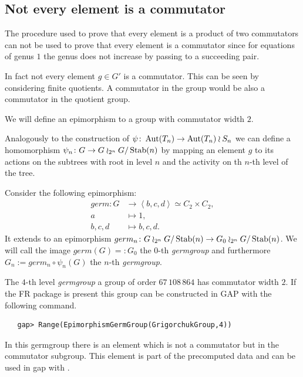 \documentclass[a4paper,11pt]{amsart}
\begin{document}
\subsection{Not every element is a commutator}
The procedure used to prove that every element is a product of two commutators 
can not be used to prove that every element is a
commutator since for equations of genus $1$ the 
genus does not increase by passing to a succeeding pair. 

In fact not every element $g\in G'$ is a commutator. This can be seen by
considering finite quotients. A commutator in the group would be also a
commutator in the quotient group. 

We will define an epimorphism to a group with commutator width $2$.

Analogously to the construction of $\psi\colon \operatorname{{Aut}}(T_n )\to \operatorname{{Aut}}(T_n) \wr S_n$
we can define a homomorphism $\psi_n\colon G \to G\wr_{2^n} {G/\operatorname{Stab}(n)}$ by
mapping an element $g$ to its actions on the subtrees with root in level $n$
and the activity on th $n$-th level of the tree.

Consider the following epimorphism:
\begin{align*}
germ\colon G&\to\left<b,c,d\right>\simeq C_2\times C_2, \\
a&\mapsto 1,\\
b,c,d&\mapsto b,c,d.
\end{align*} It extends to 
an epimorphism $germ_n\colon G\wr_{2^n} {G/\operatorname{Stab}(n)}\to G_0\wr_{2^n} {G/\operatorname{Stab}(n)}$.
We will call the image $germ(G)=:G_0$ the $0$-th \emph{germgroup} and furthermore
$G_n := germ_n \circ \psi_n(G)$ the $n$-th \emph{germgroup}.

The $4$-th level \emph{germgroup} 
a group of order $67\,108\,864$ has commutator width $2$.
If the FR package is present this group can be constructed in GAP with 
the following command. 
\begin{lstlisting}
   gap> Range(EpimorphismGermGroup(GrigorchukGroup,4))
\end{lstlisting}
In this germgroup there is an element which is not a commutator 
but in the commutator subgroup. This element is part of the
precomputed data and can be used in gap with
.	
\end{document}
